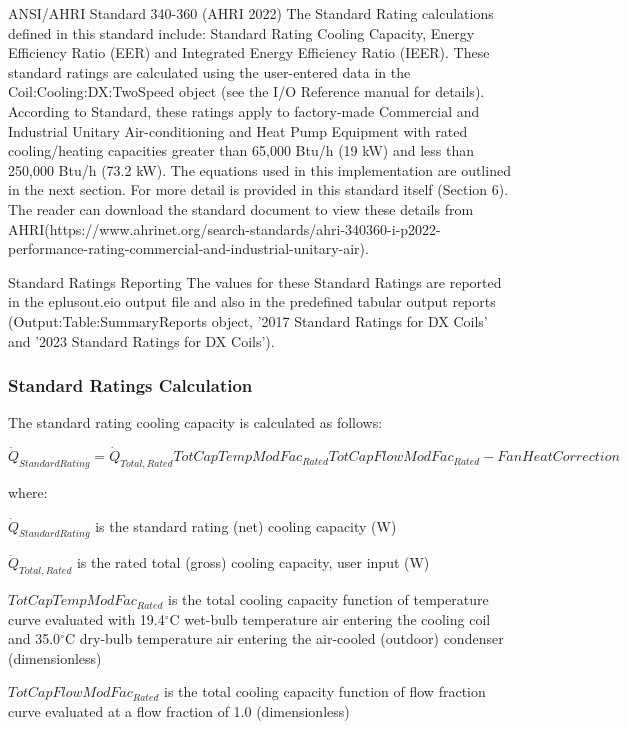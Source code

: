 ANSI/AHRI Standard 340-360 (AHRI 2022)
The Standard Rating calculations defined in this standard include: Standard Rating Cooling Capacity, Energy Efficiency Ratio (EER) and Integrated Energy Efficiency Ratio (IEER). These standard ratings are calculated using the user-entered data in the Coil:Cooling:DX:TwoSpeed object (see the I/O Reference manual for details). According to Standard, these ratings apply to factory-made Commercial and Industrial Unitary Air-conditioning and Heat Pump Equipment with rated cooling/heating capacities greater than 65,000 Btu/h (19 kW) and less than 250,000 Btu/h (73.2 kW). The equations used in this implementation are outlined in the next section.  For more detail is provided in this standard itself (Section 6). The reader can download the standard document to view these details from AHRI(https://www.ahrinet.org/search-standards/ahri-340360-i-p2022-performance-rating-commercial-and-industrial-unitary-air).

Standard Ratings Reporting
The values for these Standard Ratings are reported in the eplusout.eio output file and also in the predefined tabular output reports (Output:Table:SummaryReports object, '2017 Standard Ratings for DX Coils' and '2023 Standard Ratings for DX Coils').

\subsubsection{Standard Ratings Calculation}\label{standard-ratings-calculation}

The standard rating cooling capacity is calculated as follows:

\begin{equation}
\dot{Q}_{StandardRating} = \dot{Q}_{Total,Rated} TotCapTempModFac_{Rated} TotCapFlowModFac_{Rated} - FanHeatCorrection
\end{equation}

where:

\({\dot Q_{StandardRating}}\) is the standard rating (net) cooling capacity (W)

\({\dot Q_{Total,Rated}}\) is the rated total (gross) cooling capacity, user input (W)

\(TotCapTempModFa{c_{Rated}}\) is the total cooling capacity function of temperature curve evaluated with 19.4\(^{\circ}\)C wet-bulb temperature air entering the cooling coil and 35.0\(^{\circ}\)C dry-bulb temperature air entering the air-cooled (outdoor) condenser (dimensionless)

\(TotCapFlowModFa{c_{Rated}}\) is the total cooling capacity function of flow fraction curve evaluated at a flow fraction of 1.0 (dimensionless)

